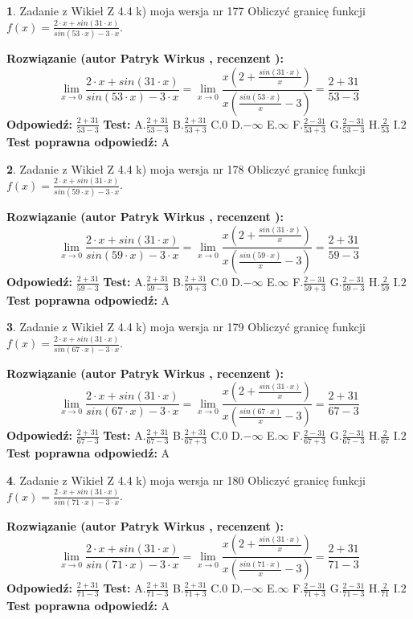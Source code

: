 \documentclass[12pt, a4paper]{article}
\theoremstyle{definition} %
\newtheorem{zad}{}
\newcommand{\zadStart}[1]{\begin{zad}#1\newline}
\newcommand{\zadStop}{\end{zad}}
\newcommand{\rozwStart}[2]{\noindent \textbf{Rozwiązanie (autor #1 , recenzent #2): }\newline}
\newcommand{\rozwStop}{\newline}
\newcommand{\odpStart}{\noindent \textbf{Odpowiedź:}\newline}
\newcommand{\odpStop}{\newline}
\newcommand{\testStart}{\noindent \textbf{Test:}\newline}
\newcommand{\testStop}{\newline}
\newcommand{\kluczStart}{\noindent \textbf{Test poprawna odpowiedź:}\newline}
\newcommand{\kluczStop}{\newline}
\begin{document}
\zadStart{Zadanie z Wikieł Z 4.4 k) moja wersja nr 177}
Obliczyć granicę funkcji $f(x)=\frac{2\cdot x +sin(31\cdot x)}{sin(53\cdot x) -3\cdot x}$.
\zadStop
\rozwStart{Patryk Wirkus}{}
$$\lim\limits_{x\to 0}\frac{2\cdot x +sin(31\cdot x)}{sin(53\cdot x) -3\cdot x}
=\lim\limits_{x\to 0}\frac{x(2+\frac{sin(31\cdot x)}{x})}{x(\frac{sin(53\cdot x)}{x}-3)}
=\frac{2+31}{53-3}$$
\rozwStop
\odpStart
$\frac{2+31}{53-3}$
\odpStop
\testStart
A.$\frac{2+31}{53-3}$
B.$\frac{2+31}{53+3}$
C.$0$
D.$-\infty$
E.$\infty$
F.$\frac{2-31}{53+3}$
G.$\frac{2-31}{53-3}$
H.$\frac{2}{53}$
I.$2$
\testStop
\kluczStart
A
\kluczStop



\zadStart{Zadanie z Wikieł Z 4.4 k) moja wersja nr 178}
Obliczyć granicę funkcji $f(x)=\frac{2\cdot x +sin(31\cdot x)}{sin(59\cdot x) -3\cdot x}$.
\zadStop
\rozwStart{Patryk Wirkus}{}
$$\lim\limits_{x\to 0}\frac{2\cdot x +sin(31\cdot x)}{sin(59\cdot x) -3\cdot x}
=\lim\limits_{x\to 0}\frac{x(2+\frac{sin(31\cdot x)}{x})}{x(\frac{sin(59\cdot x)}{x}-3)}
=\frac{2+31}{59-3}$$
\rozwStop
\odpStart
$\frac{2+31}{59-3}$
\odpStop
\testStart
A.$\frac{2+31}{59-3}$
B.$\frac{2+31}{59+3}$
C.$0$
D.$-\infty$
E.$\infty$
F.$\frac{2-31}{59+3}$
G.$\frac{2-31}{59-3}$
H.$\frac{2}{59}$
I.$2$
\testStop
\kluczStart
A
\kluczStop



\zadStart{Zadanie z Wikieł Z 4.4 k) moja wersja nr 179}
Obliczyć granicę funkcji $f(x)=\frac{2\cdot x +sin(31\cdot x)}{sin(67\cdot x) -3\cdot x}$.
\zadStop
\rozwStart{Patryk Wirkus}{}
$$\lim\limits_{x\to 0}\frac{2\cdot x +sin(31\cdot x)}{sin(67\cdot x) -3\cdot x}
=\lim\limits_{x\to 0}\frac{x(2+\frac{sin(31\cdot x)}{x})}{x(\frac{sin(67\cdot x)}{x}-3)}
=\frac{2+31}{67-3}$$
\rozwStop
\odpStart
$\frac{2+31}{67-3}$
\odpStop
\testStart
A.$\frac{2+31}{67-3}$
B.$\frac{2+31}{67+3}$
C.$0$
D.$-\infty$
E.$\infty$
F.$\frac{2-31}{67+3}$
G.$\frac{2-31}{67-3}$
H.$\frac{2}{67}$
I.$2$
\testStop
\kluczStart
A
\kluczStop



\zadStart{Zadanie z Wikieł Z 4.4 k) moja wersja nr 180}
Obliczyć granicę funkcji $f(x)=\frac{2\cdot x +sin(31\cdot x)}{sin(71\cdot x) -3\cdot x}$.
\zadStop
\rozwStart{Patryk Wirkus}{}
$$\lim\limits_{x\to 0}\frac{2\cdot x +sin(31\cdot x)}{sin(71\cdot x) -3\cdot x}
=\lim\limits_{x\to 0}\frac{x(2+\frac{sin(31\cdot x)}{x})}{x(\frac{sin(71\cdot x)}{x}-3)}
=\frac{2+31}{71-3}$$
\rozwStop
\odpStart
$\frac{2+31}{71-3}$
\odpStop
\testStart
A.$\frac{2+31}{71-3}$
B.$\frac{2+31}{71+3}$
C.$0$
D.$-\infty$
E.$\infty$
F.$\frac{2-31}{71+3}$
G.$\frac{2-31}{71-3}$
H.$\frac{2}{71}$
I.$2$
\testStop
\kluczStart
A
\kluczStop
\end{document}
